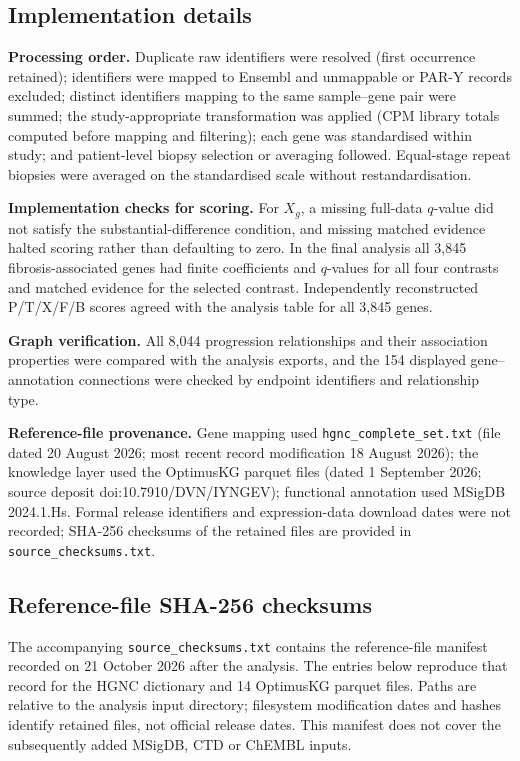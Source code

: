 \documentclass[10pt,a4paper]{article}
\begin{document}
\subsection*{Implementation details}
\textbf{Processing order.} Duplicate raw identifiers were resolved (first occurrence retained); identifiers were mapped to Ensembl and unmappable or PAR-Y records excluded; distinct identifiers mapping to the same sample--gene pair were summed; the study-appropriate transformation was applied (CPM library totals computed before mapping and filtering); each gene was standardised within study; and patient-level biopsy selection or averaging followed. Equal-stage repeat biopsies were averaged on the standardised scale without restandardisation.

\textbf{Implementation checks for scoring.} For $X_g$, a missing full-data $q$-value did not satisfy the substantial-difference condition, and missing matched evidence halted scoring rather than defaulting to zero. In the final analysis all 3,845 fibrosis-associated genes had finite coefficients and $q$-values for all four contrasts and matched evidence for the selected contrast. Independently reconstructed P/T/X/F/B scores agreed with the analysis table for all 3,845 genes.

\textbf{Graph verification.} All 8,044 progression relationships and their association properties were compared with the analysis exports, and the 154 displayed gene--annotation connections were checked by endpoint identifiers and relationship type.

\textbf{Reference-file provenance.} Gene mapping used \texttt{hgnc\_complete\_set.txt} (file dated 20 August 2026; most recent record modification 18 August 2026); the knowledge layer used the OptimusKG parquet files (dated 1 September 2026; source deposit doi:10.7910/DVN/IYNGEV); functional annotation used MSigDB 2024.1.Hs. Formal release identifiers and expression-data download dates were not recorded; SHA-256 checksums of the retained files are provided in \texttt{source\_checksums.txt}.



\clearpage
\subsection*{Reference-file SHA-256 checksums}
The accompanying \texttt{source\_checksums.txt} contains the reference-file manifest recorded on 21 October 2026 after the analysis. The entries below reproduce that record for the HGNC dictionary and 14 OptimusKG parquet files. Paths are relative to the analysis input directory; filesystem modification dates and hashes identify retained files, not official release dates. This manifest does not cover the subsequently added MSigDB, CTD or ChEMBL inputs.
\end{document}
